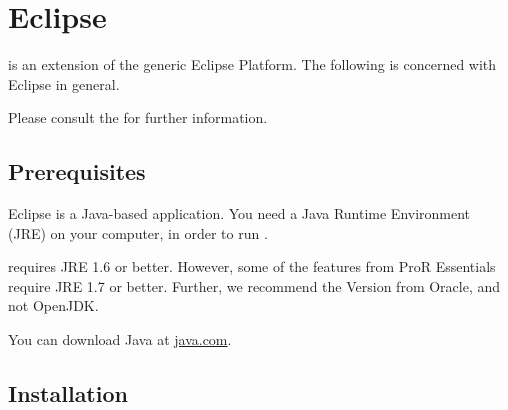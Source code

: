 % 

\section{Eclipse}
\label{sec:eclipse}

\pror{} is an extension of the generic Eclipse Platform.  The following is concerned with Eclipse in general.

\begin{info}
Please consult the 
 for further information.
\end{info}

\subsection{Prerequisites}

Eclipse is a Java-based application.  You need a Java Runtime Environment (JRE) on your computer, in order to run \pror{}.

\pror{} requires JRE 1.6 or better.  However, some of the features from ProR Essentials require JRE 1.7 or better.  Further, we recommend the Version from Oracle, and not OpenJDK.

\begin{info}
You can download Java at \href{https://www.java.com}{java.com}.
\end{info}

\subsection{Installation}
\label{sec:installation}

